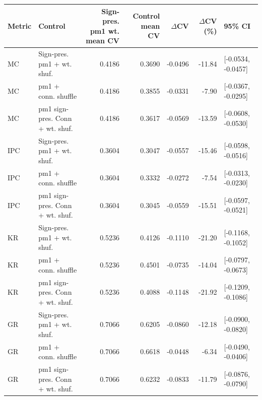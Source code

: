 \begin{tabular}{llrrrrl}
\toprule
Metric & Control & Sign-pres. pm1 wt. mean CV & Control mean CV & $\Delta$CV & $\Delta$CV (\%) & 95\% CI \\
\midrule
MC & Sign-pres. pm1 + wt. shuf. & 0.4186 & 0.3690 & -0.0496 & -11.84 & [-0.0534, -0.0457] \\
MC & pm1 + conn. shuffle & 0.4186 & 0.3855 & -0.0331 & -7.90 & [-0.0367, -0.0295] \\
MC & pm1 sign-pres. Conn + wt. shuf. & 0.4186 & 0.3617 & -0.0569 & -13.59 & [-0.0608, -0.0530] \\
IPC & Sign-pres. pm1 + wt. shuf. & 0.3604 & 0.3047 & -0.0557 & -15.46 & [-0.0598, -0.0516] \\
IPC & pm1 + conn. shuffle & 0.3604 & 0.3332 & -0.0272 & -7.54 & [-0.0313, -0.0230] \\
IPC & pm1 sign-pres. Conn + wt. shuf. & 0.3604 & 0.3045 & -0.0559 & -15.51 & [-0.0597, -0.0521] \\
KR & Sign-pres. pm1 + wt. shuf. & 0.5236 & 0.4126 & -0.1110 & -21.20 & [-0.1168, -0.1052] \\
KR & pm1 + conn. shuffle & 0.5236 & 0.4501 & -0.0735 & -14.04 & [-0.0797, -0.0673] \\
KR & pm1 sign-pres. Conn + wt. shuf. & 0.5236 & 0.4088 & -0.1148 & -21.92 & [-0.1209, -0.1086] \\
GR & Sign-pres. pm1 + wt. shuf. & 0.7066 & 0.6205 & -0.0860 & -12.18 & [-0.0900, -0.0820] \\
GR & pm1 + conn. shuffle & 0.7066 & 0.6618 & -0.0448 & -6.34 & [-0.0490, -0.0406] \\
GR & pm1 sign-pres. Conn + wt. shuf. & 0.7066 & 0.6232 & -0.0833 & -11.79 & [-0.0876, -0.0790] \\
\bottomrule
\end{tabular}
